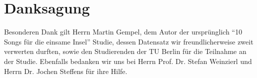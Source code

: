\section*{Danksagung}
\label{sec:Danksagung}
Besonderen Dank gilt Herrn Martin Gempel, dem Autor der ursprünglich "`10 Songs für die einsame Insel"' Studie, dessen Datensatz wir freundlicherweise zweit verwerten durften, sowie den Studierenden der TU Berlin für die Teilnahme an der Studie.
Ebenfalls bedanken wir uns bei Herrn Prof. Dr. Stefan Weinzierl und Herrn Dr. Jochen Steffens für ihre Hilfe.
